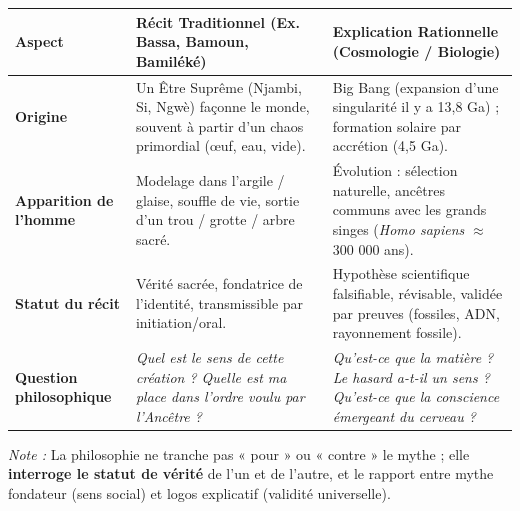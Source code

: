 \documentclass[11pt]{article}
\newcommand{\cle}[1]{{\popxbold\color{popdark}#1}}
\begin{document}
\begin{exemplebox}
\begin{center}
\begin{tabularx}{\linewidth}{|l|X|X|}\hline
\rowcolor{popblueL} \textbf{Aspect} & \textbf{Récit Traditionnel (Ex. Bassa, Bamoun, Bamiléké)} & \textbf{Explication Rationnelle (Cosmologie / Biologie)} \\ \hline
\textbf{Origine} & Un Être Suprême (Njambi, Si, Ngwè) façonne le monde, souvent à partir d'un chaos primordial (œuf, eau, vide). & \cle{Big Bang} (expansion d'une singularité il y a 13,8 Ga) ; formation solaire par accrétion (4,5 Ga). \\ \hline
\textbf{Apparition de l'homme} & Modelage dans l'argile / glaise, souffle de vie, sortie d'un trou / grotte / arbre sacré. & \cle{Évolution} : sélection naturelle, ancêtres communs avec les grands singes (\emph{Homo sapiens} $\approx$ 300 000 ans). \\ \hline
\textbf{Statut du récit} & \cle{Vérité sacrée}, fondatrice de l'identité, transmissible par initiation/oral. & \cle{Hypothèse scientifique} falsifiable, révisable, validée par preuves (fossiles, ADN, rayonnement fossile). \\ \hline
\textbf{Question philosophique} & \emph{Quel est le sens de cette création ? Quelle est ma place dans l'ordre voulu par l'Ancêtre ?} & \emph{Qu'est-ce que la matière ? Le hasard a-t-il un sens ? Qu'est-ce que la conscience émergeant du cerveau ?} \\ \hline
\end{tabularx}
\end{center}
\emph{Note :} La philosophie ne tranche pas « pour » ou « contre » le mythe ; elle \textbf{interroge le statut de vérité} de l'un et de l'autre, et le rapport entre \cle{mythe fondateur} (sens social) et \cle{logos explicatif} (validité universelle).
\end{exemplebox}
\end{document}
